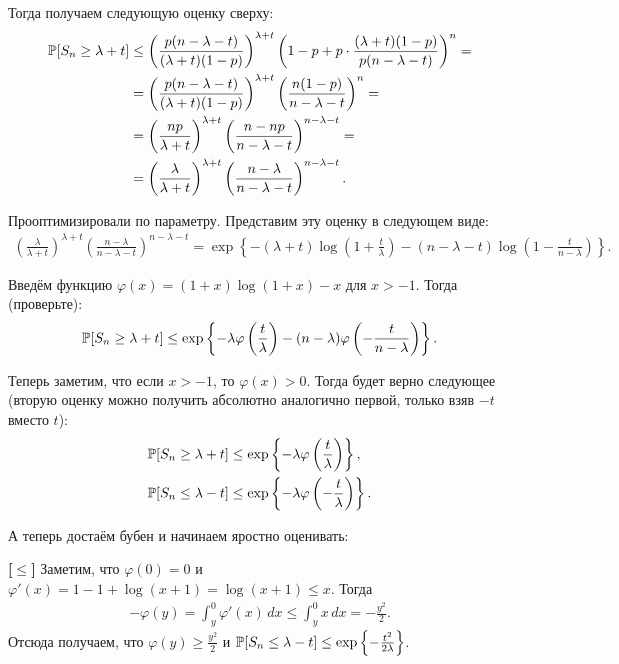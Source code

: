 \begin{proofbox}
    Тогда получаем следующую оценку сверху:
    \begin{align*}
        \P[S_n \ge \lambda + t] &\le \left( \frac{p(n - \lambda - t)}{(\lambda + t)(1 - p)} \right)^{\lambda + t} \left( 1 - p + p \cdot \frac{(\lambda + t)(1 - p)}{p(n - \lambda - t)} \right)^n = \\
        &= \left( \frac{p(n - \lambda - t)}{(\lambda + t)(1 - p)} \right)^{\lambda + t} \left( \frac{n(1 - p)}{n - \lambda - t} \right)^n = \\
        &= \left( \frac{np}{\lambda + t} \right)^{\lambda + t} \left( \frac{n - np}{n - \lambda - t} \right)^{n - \lambda - t} = \\
        &= \left( \frac{\lambda}{\lambda + t} \right)^{\lambda + t} \left( \frac{n - \lambda}{n - \lambda - t} \right)^{n - \lambda - t}.
    \end{align*}

    Прооптимизировали по параметру. Представим эту оценку в следующем виде:
    \begin{align*}
        \left( \frac{\lambda}{\lambda + t} \right)^{\lambda + t} \left( \frac{n - \lambda}{n - \lambda - t} \right)^{n - \lambda - t} = \exp\left\{ -(\lambda + t) \log\left( 1 + \frac{t}{\lambda} \right) - (n - \lambda - t) \log\left( 1 - \frac{t}{n - \lambda} \right) \right\}.
    \end{align*}

    Введём функцию $\varphi(x) = (1 + x) \log(1 + x) - x$ для $x > -1$. Тогда (проверьте):
    \begin{align*}
        \P[S_n \ge \lambda + t] \le \exp\left\{ -\lambda \varphi\left(\frac{t}{\lambda}\right) - (n - \lambda) \varphi\left(-\frac{t}{n - \lambda}\right) \right\}.
    \end{align*}

    Теперь заметим, что если $x > -1$, то $\varphi(x) > 0$. Тогда будет верно следующее (вторую оценку можно получить абсолютно аналогично первой, только взяв $-t$ вместо $t$):
    \begin{align*}
        \P[S_n \ge \lambda + t] &\le \exp\left\{ -\lambda \varphi\left(\frac{t}{\lambda}\right) \right\}, \\
        \P[S_n \le \lambda - t] &\le \exp\left\{ -\lambda \varphi\left(-\frac{t}{\lambda}\right) \right\}.
    \end{align*}

    А теперь достаём бубен и начинаем яростно оценивать:

    \textbf{[$\le$]} Заметим, что $\varphi(0) = 0$ и $\varphi'(x) = 1 - 1 + \log(x + 1) = \log(x + 1) \le x$. Тогда
    \begin{align*}
        -\varphi(y) = \int_y^0 \varphi'(x) \, dx \le \int_y^0 x \, dx = -\frac{y^2}{2}.
    \end{align*}
    Отсюда получаем, что $\varphi(y) \ge \frac{y^2}{2}$ и $\P[S_n \le \lambda - t] \le \exp\left\{ -\frac{t^2}{2\lambda} \right\}$.


\end{proofbox}
